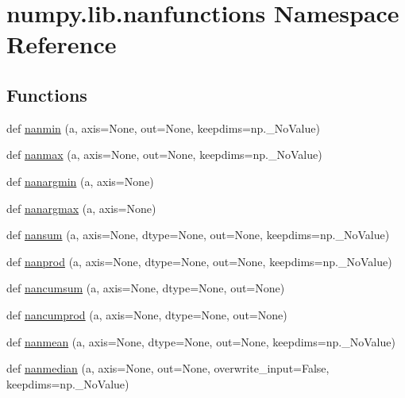 \hypertarget{namespacenumpy_1_1lib_1_1nanfunctions}{}\section{numpy.\+lib.\+nanfunctions Namespace Reference}
\label{namespacenumpy_1_1lib_1_1nanfunctions}
\subsection*{Functions}
\begin{DoxyCompactItemize}
\item 
def \hyperlink{namespacenumpy_1_1lib_1_1nanfunctions_a8e2e3d5692a3b58cd6a1ec33af0789e0}{nanmin} (a, axis=None, out=None, keepdims=np.\+\_\+\+No\+Value)
\item 
def \hyperlink{namespacenumpy_1_1lib_1_1nanfunctions_a162941364126b496b7b4140a6fed4202}{nanmax} (a, axis=None, out=None, keepdims=np.\+\_\+\+No\+Value)
\item 
def \hyperlink{namespacenumpy_1_1lib_1_1nanfunctions_a835b6215d99db0102994600c63acb588}{nanargmin} (a, axis=None)
\item 
def \hyperlink{namespacenumpy_1_1lib_1_1nanfunctions_a23fc5bd2a6de7b40b293243ed9cd95c7}{nanargmax} (a, axis=None)
\item 
def \hyperlink{namespacenumpy_1_1lib_1_1nanfunctions_a763c827042a377c7ac967cd3b703694b}{nansum} (a, axis=None, dtype=None, out=None, keepdims=np.\+\_\+\+No\+Value)
\item 
def \hyperlink{namespacenumpy_1_1lib_1_1nanfunctions_a7c5e7f7084f8d2535e4506776ac0c98f}{nanprod} (a, axis=None, dtype=None, out=None, keepdims=np.\+\_\+\+No\+Value)
\item 
def \hyperlink{namespacenumpy_1_1lib_1_1nanfunctions_abda36044421269514fdf5636cddb32a0}{nancumsum} (a, axis=None, dtype=None, out=None)
\item 
def \hyperlink{namespacenumpy_1_1lib_1_1nanfunctions_a0bccbe7cb1e5d6900166312043d34e14}{nancumprod} (a, axis=None, dtype=None, out=None)
\item 
def \hyperlink{namespacenumpy_1_1lib_1_1nanfunctions_a625e2e39b5b888f941c359b85f962022}{nanmean} (a, axis=None, dtype=None, out=None, keepdims=np.\+\_\+\+No\+Value)
\item 
def \hyperlink{namespacenumpy_1_1lib_1_1nanfunctions_ac8860b2b8666f170298c8e7c23cf592b}{nanmedian} (a, axis=None, out=None, overwrite\+\_\+input=False, keepdims=np.\+\_\+\+No\+Value)
\item 

\end{DoxyCompactItemize}
